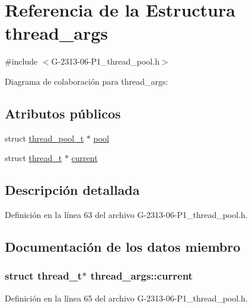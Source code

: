 \hypertarget{structthread__args}{}\section{Referencia de la Estructura thread\+\_\+args}
\label{structthread__args}


{\ttfamily \#include $<$G-\/2313-\/06-\/\+P1\+\_\+thread\+\_\+pool.\+h$>$}



Diagrama de colaboración para thread\+\_\+args\+:
\subsection*{Atributos públicos}
\begin{DoxyCompactItemize}
\item 
struct \hyperlink{structthread__pool__t}{thread\+\_\+pool\+\_\+t} $\ast$ \hyperlink{structthread__args_a425ced5f77dcbb52f61d240a4e207a27}{pool}
\item 
struct \hyperlink{structthread__t}{thread\+\_\+t} $\ast$ \hyperlink{structthread__args_a191f3ea514283452d04bde31cde4c7ad}{current}
\end{DoxyCompactItemize}


\subsection{Descripción detallada}


Definición en la línea 63 del archivo G-\/2313-\/06-\/\+P1\+\_\+thread\+\_\+pool.\+h.



\subsection{Documentación de los datos miembro}
\subsubsection[{\texorpdfstring{current}{current}}]{\setlength{\rightskip}{0pt plus 5cm}struct {\bf thread\+\_\+t}$\ast$ thread\+\_\+args\+::current}\hypertarget{structthread__args_a191f3ea514283452d04bde31cde4c7ad}{}\label{structthread__args_a191f3ea514283452d04bde31cde4c7ad}


Definición en la línea 65 del archivo G-\/2313-\/06-\/\+P1\+\_\+thread\+\_\+pool.\+h.

